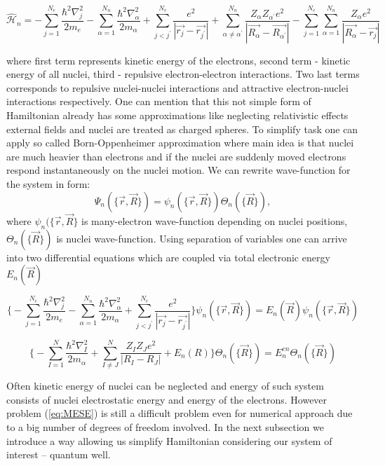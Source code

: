 \documentclass[10pt]{article}
\newcommand*{\hatH}{\hat{\mathcal{H}}}
\begin{document}
\[
\hatH_n = -\sum_{j=1}^{N_e} \frac{\hbar^2\nabla_j^2}{2m_e} -\sum_{\alpha=1}^{N_n} \frac{\hbar^2\nabla_{\alpha}^2}{2m_\alpha} +
          \sum_{j<j^{\prime}}^{N_e} \frac{e^2}{|\vec{r_j} - \vec{r_{j^{\prime}}}|} + \sum_{\alpha\neq \alpha^{\prime}}^{N_n} \frac{Z_{\alpha}Z_{\alpha^{\prime}}e^2}{|\vec{R_{\alpha}} - \vec{R_{\alpha^{\prime}}}|} - \sum_{j=1}^{N_e} \sum_{\alpha=1}^{N_n} \frac{Z_{\alpha}e^2}{|\vec{R_{\alpha}} - \vec{r_j}|}
\]

where first term represents kinetic energy of the electrons, second term - kinetic energy of all nuclei, third - repulsive electron-electron interactions. Two last terms corresponds to repulsive nuclei-nuclei interactions and attractive electron-nuclei interactions respectively. One can mention that this not simple form of Hamiltonian already has some approximations like neglecting relativistic effects external fields and nuclei are treated as charged spheres.
To simplify task one can apply so called Born-Oppenheimer approximation where main idea is that nuclei are much heavier than electrons and if the nuclei are suddenly moved electrons respond instantaneously on the nuclei motion. We can rewrite wave-function for the system in form:
\[
\Psi_n(\{\vec{r}, \vec{R}\}) = \psi_n(\{\vec{r}, \vec{R}\})\Theta_n(\{\vec{R}\}),
\]
where $\psi_n(\{\vec{r}, \vec{R}\}$ is many-electron wave-function depending on nuclei positions, $\Theta_n(\{\vec{R}\})$ is nuclei wave-function.
Using separation of variables one can arrive into two differential equations which are coupled via total electronic energy $E_n(\vec{R})$

\begin{equation}\label{eq:MESE}
\Big\{-\sum_{j=1}^{N_e} \frac{\hbar^2\nabla_j^2}{2m_e} -\sum_{\alpha=1}^{N_n} \frac{\hbar^2\nabla_{\alpha}^2}{2m_\alpha} +\sum_{j<j^{\prime}}^{N_e} \frac{e^2}{|\vec{r_j} - \vec{r_{j^{\prime}}}|} \Big\} \psi_n(\{\vec{r}, \vec{R}\}) = E_n(\vec{R}) \psi_n(\{\vec{r}, \vec{R}\}) 
\end{equation}

\begin{equation}
\Big\{-\sum_{I=1}^{N} \frac{\hbar^2\nabla_I^2}{2m_\alpha} + \sum_{I\neq J}^{N} \frac{Z_IZ_Je^2}{|R_I-R_J|} + E_n(R)\Big\}\Theta_n(\{\vec{R}\})=E_n^{en}\Theta_n(\{\vec{R}\})
\end{equation}

Often kinetic energy of nuclei can be neglected and energy of such system consists of nuclei electrostatic energy and energy of the electrons.
However problem (\ref{eq:MESE}) is still a difficult problem even for numerical approach due to a big number of degrees of freedom involved.
In the next subsection we introduce a way allowing us simplify Hamiltonian considering our system of interest -- quantum well. 
\end{document}
